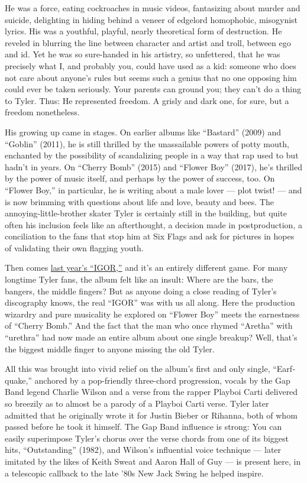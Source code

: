 He was a force, eating cockroaches in music videos, fantasizing about
murder and suicide, delighting in hiding behind a veneer of edgelord
homophobic, misogynist lyrics. His was a youthful, playful, nearly
theoretical form of destruction. He reveled in blurring the line between
character and artist and troll, between ego and id. Yet he was so
sure-handed in his artistry, so unfettered, that he was precisely what
I, and probably you, could have used as a kid: someone who does not care
about anyone's rules but seems such a genius that no one opposing him
could ever be taken seriously. Your parents can ground you; they can't
do a thing to Tyler. Thus: He represented freedom. A grisly and dark
one, for sure, but a freedom nonetheless.

His growing up came in stages. On earlier albums like ``Bastard'' (2009)
and ``Goblin'' (2011), he is still thrilled by the unassailable powers
of potty mouth, enchanted by the possibility of scandalizing people in a
way that rap used to but hadn't in years. On ``Cherry Bomb'' (2015) and
``Flower Boy'' (2017), he's thrilled by the power of music itself, and
perhaps by the power of success, too. On ``Flower Boy,'' in particular,
he is writing about a male lover --- plot twist! --- and is now brimming
with questions about life and love, beauty and bees. The
annoying-little-brother skater Tyler is certainly still in the building,
but quite often his inclusion feels like an afterthought, a decision
made in post­production, a conciliation to the fans that stop him at Six
Flags and ask for pictures in hopes of validating their own flagging
youth.

Then comes
\href{https://www.nytimes3xbfgragh.onion/2019/06/07/arts/music/tyler-the-creator-igor-kevin-abstract-arizona-baby-review.html}{last
year's ``IGOR,''} and it's an entirely different game. For many longtime
Tyler fans, the album felt like an insult: Where are the bars, the
bangers, the middle fingers? But as anyone doing a close reading of
Tyler's discography knows, the real ``IGOR'' was with us all along. Here
the production wizardry and pure musicality he explored on ``Flower
Boy'' meets the earnestness of ``Cherry Bomb.'' And the fact that the
man who once rhymed ``Aretha'' with ``urethra'' had now made an entire
album about one single breakup? Well, that's the biggest middle finger
to anyone missing the old Tyler.

All this was brought into vivid relief on the album's first and only
single, ``Earf­quake,'' anchored by a pop-friendly three-chord
progression, vocals by the Gap Band legend Charlie Wilson and a verse
from the rapper Playboi Carti delivered so breezily as to almost be a
parody of a Playboi Carti verse. Tyler later admitted that he originally
wrote it for Justin Bieber or Rihanna, both of whom passed before he
took it himself. The Gap Band influence is strong: You can easily
superimpose Tyler's chorus over the verse chords from one of its biggest
hits, ``Outstanding'' (1982), and Wilson's influential voice technique
--- later imitated by the likes of Keith Sweat and Aaron Hall of Guy ---
is present here, in a telescopic callback to the late '80s New Jack
Swing he helped inspire.

